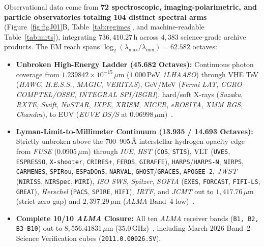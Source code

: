 \documentclass[twocolumn,10pt]{article}
\begin{document}
Observational data come from \textbf{72 spectroscopic, imaging-polarimetric, and particle observatories totaling 104 distinct spectral arms} (Figure~\ref{fig:figJ01}B, Table~\ref{tab:regimes}, and machine-readable Table~\ref{tab:mrts}), integrating $736{,}410.27\,\mathrm{h}$ across $4{,}383$ science-grade archive products. The EM reach spans $\log_2(\lambda_{\max}/\lambda_{\min}) = \mathbf{62.582}$ octaves:
\begin{itemize}
  \item \textbf{Unbroken High-Energy Ladder (45.682 Octaves):} Continuous photon coverage from $1.239842\times 10^{-15}\,\mu\text{m}$ ($1.000\,\mathrm{PeV}$ \textit{1LHAASO}) through VHE TeV (\textit{HAWC}, \textit{H.E.S.S.}, \textit{MAGIC}, \textit{VERITAS}), GeV/MeV (\textit{Fermi LAT}, \textit{CGRO COMPTEL/OSSE}, \textit{INTEGRAL SPI/ISGRI}), hard/soft X-rays (\textit{Suzaku}, \textit{RXTE}, \textit{Swift}, \textit{NuSTAR}, \textit{IXPE}, \textit{XRISM}, \textit{NICER}, \textit{eROSITA}, \textit{XMM RGS}, \textit{Chandra}), to EUV (\textit{EUVE DS/S} at $0.06998\,\mu\text{m}$)~\cite{Aharonian2006,Atwood2009,Winkler2003,Cao2024,Weisskopf2022,Predehl2021}.
  \item \textbf{Lyman-Limit-to-Millimeter Continuum (13.935 / 14.693 Octaves):} Strictly unbroken above the $700\text{--}905\,\text{\AA}$ interstellar hydrogen opacity edge from \textit{FUSE} ($0.0905\,\mu\text{m}$) through \textit{IUE}, \textit{HST} (\texttt{COS}, \texttt{STIS}), VLT (\texttt{UVES}, \texttt{ESPRESSO}, \texttt{X-shooter}, \texttt{CRIRES+}, \texttt{FEROS}, \texttt{GIRAFFE}), \texttt{HARPS}/\texttt{HARPS-N}, \texttt{NIRPS}, \texttt{CARMENES}, \texttt{SPIRou}, \texttt{ESPaDOnS}, \texttt{NARVAL}, \texttt{GHOST}/\texttt{GRACES}, \texttt{APOGEE-2}, \textit{JWST} (\texttt{NIRISS}, \texttt{NIRSpec}, \texttt{MIRI}), \textit{ISO SWS}, \textit{Spitzer}, \textit{SOFIA} (\texttt{EXES}, \texttt{FORCAST}, \texttt{FIFI-LS}, \texttt{GREAT}), \textit{Herschel} (\texttt{PACS}, \texttt{SPIRE}, \texttt{HIFI}), \textit{IRTF}, and \textit{JCMT} out to $1{,}417.76\,\mu\text{m}$ (strict zero gap) and $2{,}397.29\,\mu\text{m}$ (\textit{ALMA} Band~4 low)~\cite{Moos2000,Mayor2003,Pepe2021,Gardner2023,Pilbratt2010}.
  \item \textbf{Complete 10/10 \textit{ALMA} Closure:} All ten \textit{ALMA} receiver bands (\texttt{B1, B2, B3--B10}) out to $8{,}556.41831\,\mu\text{m}$ ($35.0\,\mathrm{GHz}$)~\cite{Wootten2009}, including March 2026 Band~2 Science Verification cubes (\texttt{2011.0.00026.SV}).
\end{itemize}
\end{document}
